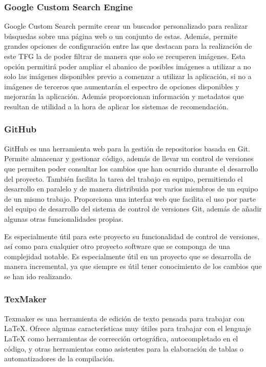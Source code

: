 \subsubsection{Google Custom Search Engine}

Google Custom Search \cite{GCSearch} permite crear un buscador personalizado para realizar búsquedas sobre una página web o un conjunto de estas. Además, permite grandes opciones de configuración entre las que destacan para la realización de este \ac{TFG} la de poder filtrar de manera que solo se recuperen imágenes. Esta opción permitirá poder ampliar el abanico de posibles imágenes a utilizar a no solo las imágenes disponibles previo a comenzar a utilizar la aplicación, si no a imágenes de terceros que aumentarán el espectro de opciones disponibles y mejorarán la aplicación. Además proporcionan información y metadatos que resultan de utilidad a la hora de aplicar los sistemas de recomendación.

\subsubsection{GitHub}

GitHub \cite{GitHub} es una herramienta web para la gestión de repositorios  basada en Git\cite{Git}. Permite almacenar y gestionar código, además de llevar un control de versiones que permiten poder consultar los cambios que han ocurrido durante el desarrollo del proyecto. También facilita la tarea del trabajo en equipo, permitiendo el desarrollo en paralelo y de manera distribuida por varios miembros de un equipo de un mismo trabajo. Proporciona una interfaz web que facilita el uso por parte del equipo de desarrollo del sistema de control de versiones Git, además de añadir algunas otras funcionalidades propias.

Es especialmente útil para este proyecto su funcionalidad de control de versiones, así como para cualquier otro proyecto software que se componga de una complejidad notable. Es especialmente útil en un proyecto que se desarrolla de manera incremental, ya que siempre es útil tener conocimiento de los cambios que se han ido realizando.

\subsubsection{TexMaker}

Texmaker es una herramienta de edición de texto pensada para trabajar con LaTeX. Ofrece algunas características muy útiles para trabajar con el lenguaje LaTeX como herramientas de corrección ortográfica, autocompletado en el código, y otras herramientas como asistentes para la elaboración de tablas o automatizadores de la compilación.



 
